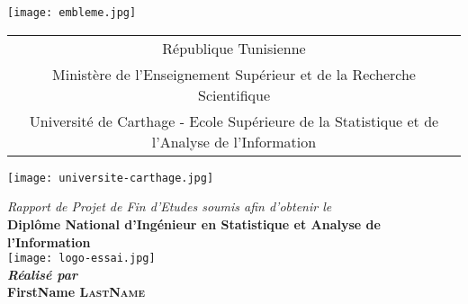 \documentclass[a4paper, oneside, 12pt, final]{extreport}
\title{\reportSubject}
\author{\reportAuthor}
\newcommand{\reportTitle} {%
  \textsc{Projet de Fin d'\'etudes}
}
\newcommand{\reportAuthor} {%
  FirstName \textsc{LastName}%
}
\newcommand{\ESSAI} {%
  Ecole Sup\'erieure de la Statistique et de l'Analyse de l'Information
}
\begin{document}
\thispagestyle{empty}
\begin{titlepage}
\begin{center}



\texttt{[image: embleme.jpg]}
\vspace{0.5cm}

{%
  \fontsize{9pt}{9pt}\selectfont%
  \begin{tabular}{c}
    R\'epublique Tunisienne \\
    Minist\`ere de l'Enseignement Supérieur et de la Recherche Scientifique \\%
    Universit\'e de Carthage - \ESSAI{}\\ 
  \end{tabular}
}

\vspace{0.5cm}

\texttt{[image: universite-carthage.jpg]}



\vspace{5pt} {%
  \renewcommand*{\familydefault}{\defaultFont}
  \fontsize{46pt}{46pt}\selectfont%
}


\vspace{10pt}
{\textit{Rapport de Projet de Fin d'Etudes soumis afin d'obtenir le}}\\

\vspace{10pt}
{\textbf{\large Diplôme National d'Ingénieur en Statistique et Analyse de l'Information}}\\

\texttt{[image: logo-essai.jpg]}\\

\vspace{5pt}
\textbf{\textit{Réalisé par}}\\
\vspace{10pt} {%
  \fontsize{14pt}{14pt}\selectfont%
  {\bfseries\Large\sc \reportAuthor}\\
}%


\end{center}
\end{titlepage}
\end{document}
